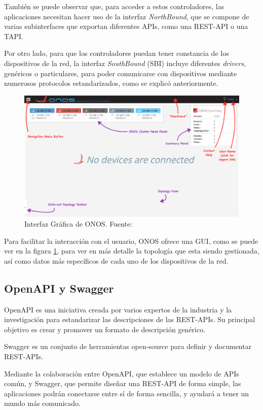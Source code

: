 También se puede observar que, para acceder a estos controladores, las aplicaciones necesitan hacer uso de la interfaz \textit{NorthBound}, que se compone de varias subinterfaces que exportan diferentes \acp{API}, como una REST-\ac{API} o una \ac{TAPI}.

Por otro lado, para que los controladores puedan tener constancia de los dispositivos de la red, la interfaz \textit{SouthBound} (\ac{SBI}) incluye diferentes \textit{drivers}, genéricos o particulares, para poder comunicarse con dispositivos mediante numerosos protocolos estandarizados, como se explicó anteriormente.

\begin{figure}[!ht]
	\centering
	\includegraphics[width=0.8\linewidth]{imagenes/onos_gui}
	\caption{Interfaz Gráfica de ONOS. 
		Fuente: \cite{wikionosbib}}
	\label{fig:onosgui}
\end{figure}

Para facilitar la interacción con el usuario, \ac{ONOS} ofrece una \ac{GUI}, como se puede ver en la figura \ref{fig:onosgui}, para ver en más detalle la topología que esta siendo gestionada, así como datos más específicos de cada uno de los dispositivos de la red. 


\subsection{OpenAPI y Swagger}
\label{subsec:openapi}

OpenAPI\cite{openapibib} es una iniciativa creada por varios expertos de la industria y la investigación para estandarizar las descripciones de las REST-\acp{API}. Su principal objetivo es crear y promover un formato de descripción genérico.

Swagger\cite{swaggerbib} es un conjunto de herramientas open-source para definir y documentar REST-\acp{API}.

Mediante la colaboración entre OpenAPI, que establece un modelo de \acp{API} común, y Swagger, que permite diseñar una REST-\ac{API} de forma simple, las aplicaciones podrán conectarse entre sí de forma sencilla, y ayudará a tener un mundo más comunicado.

